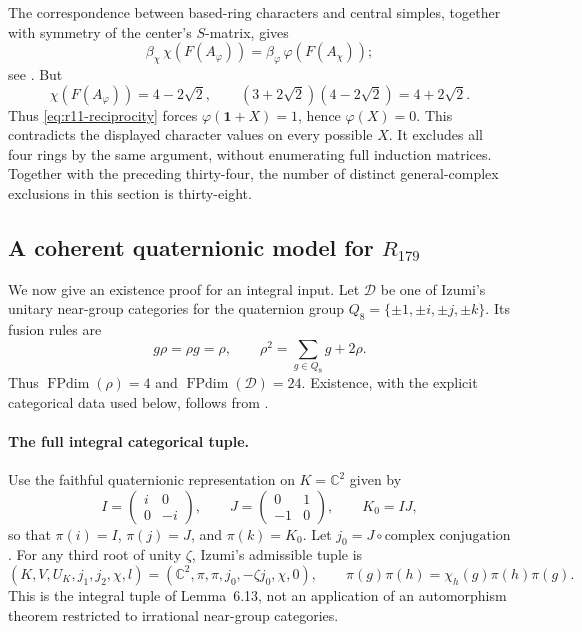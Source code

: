 \documentclass[11pt,a4paper]{article}
\begin{document}
The correspondence between based-ring characters and central simples,
together with symmetry of the center's $S$-matrix, gives
\begin{equation}\label{eq:r11-reciprocity}
 \beta_\chi\,\chi(F(A_\varphi))
 =\beta_\varphi\,\varphi(F(A_\chi));
\end{equation}
see \cite[Example~2.9 and the discussion preceding Theorem~2.13]
{OstrikPivotal}. But
\[
 \chi(F(A_\varphi))=4-2\sqrt2,
 \qquad
 (3+2\sqrt2)(4-2\sqrt2)=4+2\sqrt2.
\]
Thus \eqref{eq:r11-reciprocity} forces
$\varphi(\mathbf1+X)=1$, hence $\varphi(X)=0$. This contradicts the
displayed character values on every possible $X$. It excludes all four
rings by the same argument, without enumerating full induction matrices.
Together with the preceding thirty-four, the number of distinct
general-complex exclusions in this section is thirty-eight.

\subsection{A coherent quaternionic model for $R_{179}$}
\label{subsec:r11-quaternionic-model}

We now give an existence proof for an integral input. Let $\mathcal D$ be
one of Izumi's unitary near-group categories for the quaternion group
$Q_8=\{\pm1,\pm i,\pm j,\pm k\}$. Its fusion rules are
\begin{equation}\label{eq:r11-Q8-base}
 g\rho=\rho g=\rho,
 \qquad \rho^2=\sum_{g\in Q_8}g+2\rho.
\end{equation}
Thus $\operatorname{FPdim}(\rho)=4$ and
$\operatorname{FPdim}(\mathcal D)=24$.
Existence, with the explicit categorical data used below, follows from
\cite[Theorems~1.1 and~6.1, Lemma~6.13]{Izumi}.

\paragraph{The full integral categorical tuple.}
Use the faithful quaternionic representation on $K=\mathbb C^2$ given by
\[
 I=\begin{pmatrix}i&0\\0&-i\end{pmatrix},
 \qquad J=\begin{pmatrix}0&1\\-1&0\end{pmatrix},
 \qquad K_0=IJ,
\]
so that $\pi(i)=I$, $\pi(j)=J$, and $\pi(k)=K_0$.
Let $j_0=J\circ\text{complex conjugation}$. For any third root of unity
$\zeta$, Izumi's admissible tuple is
\begin{equation}\label{eq:r11-integral-tuple}
 (K,V,U_K,j_1,j_2,\chi,l)
 =(\mathbb C^2,\pi,\pi,j_0,-\zeta j_0,\chi,0),
 \qquad
 \pi(g)\pi(h)=\chi_h(g)\pi(h)\pi(g).
\end{equation}
This is the integral tuple of Lemma~6.13, not an application of an
automorphism theorem restricted to irrational near-group categories.
\end{document}
